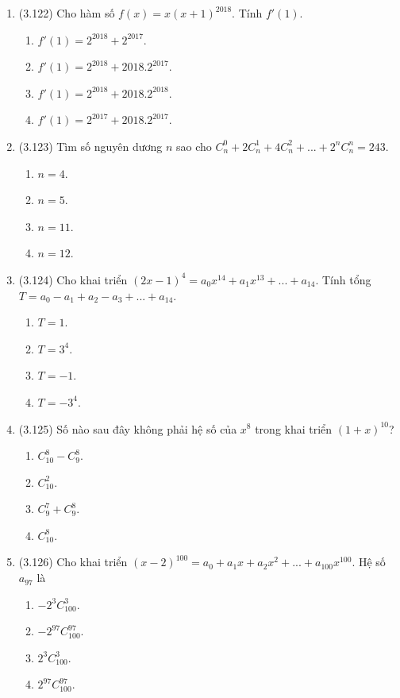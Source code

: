 \begin{enumerate}[label=\textbf{Câu \arabic*.},align=left,left=0cm..0cm,itemindent=*]
\begin{enumerate}[label=\textbf{\Alph*.},align=left,left=1cm..0cm,itemindent=*]
	\end{enumerate}
	\item (3.122) Cho hàm số $f(x)=x(x+1)^{2018}$. Tính $f'(1)$.
	\begin{enumerate}[label=\textbf{\Alph*.},align=left,left=1cm..0cm,itemindent=*]
	    \item $f'(1)=2^{2018}+2^{2017}$.
	    \item $f'(1)=2^{2018}+2018.2^{2017}$.
	    \item $f'(1)=2^{2018}+2018.2^{2018}$.
	    \item $f'(1)=2^{2017}+2018.2^{2017}$.
	\end{enumerate}
	\item (3.123) Tìm số nguyên dương $n$ sao cho $C_n^0+2C_n^1+4C_n^2+...+2^nC_n^n=243$.
	\begin{enumerate}[label=\textbf{\Alph*.},align=left,left=1cm..0cm,itemindent=*]
	    \item $n=4$. \item $n=5$. \item $n=11$. \item $n=12$.
	\end{enumerate}
	\item (3.124) Cho khai triển $(2x-1)^4=a_0x^{14}+a_1x^{13}+...+a_{14}$. Tính tổng $T=a_0-a_1+a_2-a_3+...+a_{14}$.
	\begin{enumerate}[label=\textbf{\Alph*.},align=left,left=1cm..0cm,itemindent=*]
	    \item $T=1$. \item $T=3^4$. \item $T=-1$. \item $T=-3^4$.
	\end{enumerate}
	\item (3.125) Số nào sau đây không phải hệ số của $x^8$ trong khai triển $(1+x)^{10}$?
	\begin{enumerate}[label=\textbf{\Alph*.},align=left,left=1cm..0cm,itemindent=*]
	    \item $C_{10}^8-C_9^8$. \item $C_{10}^2$. \item $C_9^7+C_9^8$. \item $C_{10}^8$.
	\end{enumerate}
	\item (3.126) Cho khai triển $(x-2)^{100}=a_0+a_1x+a_2x^2+...+a_{100}x^{100}$. Hệ số $a_{97}$ là
	\begin{enumerate}[label=\textbf{\Alph*.},align=left,left=1cm..0cm,itemindent=*]
	    \item $-2^3C_{100}^3$. \item $-2^{97}C_{100}^{97}$. \item $2^3C_{100}^3$. \item $2^{97}C_{100}^{97}$.

\end{enumerate}
\end{enumerate}
